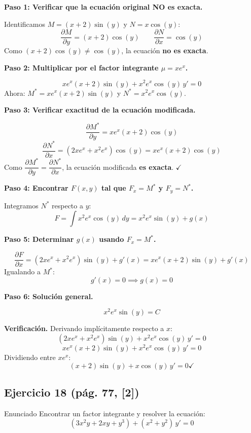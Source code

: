 \begin{respuesta}

\textbf{Paso 1: Verificar que la ecuación original NO es exacta.}

Identificamos $M = (x+2)\sin(y)$ y $N = x\cos(y)$:
\[
    \frac{\partial M}{\partial y} = (x+2)\cos(y) \qquad 
    \frac{\partial N}{\partial x} = \cos(y)
\]
Como $(x+2)\cos(y) \neq \cos(y)$, la ecuación \textbf{no es exacta}.

\medskip
\textbf{Paso 2: Multiplicar por el factor integrante $\mu = xe^x$.}

\[
    xe^x(x+2)\sin(y) + x^2e^x\cos(y)\,y' = 0
\]
Ahora: $M^* = xe^x(x+2)\sin(y)$ y $N^* = x^2e^x\cos(y)$.

\medskip
\textbf{Paso 3: Verificar exactitud de la ecuación modificada.}

\[
    \frac{\partial M^*}{\partial y} = xe^x(x+2)\cos(y)
\]
\[
    \frac{\partial N^*}{\partial x} = (2xe^x + x^2e^x)\cos(y) 
    = xe^x(x+2)\cos(y)
\]
Como $\dfrac{\partial M^*}{\partial y} = \dfrac{\partial N^*}{\partial x}$,
la ecuación modificada \textbf{es exacta}. $\checkmark$

\medskip
\textbf{Paso 4: Encontrar $F(x,y)$ tal que $F_x = M^*$ y $F_y = N^*$.}

Integramos $N^*$ respecto a $y$:
\[
    F = \int x^2e^x\cos(y)\,dy = x^2e^x\sin(y) + g(x)
\]

\medskip
\textbf{Paso 5: Determinar $g(x)$ usando $F_x = M^*$.}

\[
    \frac{\partial F}{\partial x} = (2xe^x + x^2e^x)\sin(y) + g'(x) 
    = xe^x(x+2)\sin(y) + g'(x)
\]
Igualando a $M^*$:
\[
    g'(x) = 0 \implies g(x) = 0
\]

\medskip
\textbf{Paso 6: Solución general.}

\[
    \boxed{x^2e^x\sin(y) = C}
\]

\medskip
\textbf{Verificación.} Derivando implícitamente respecto a $x$:
\[
    (2xe^x + x^2e^x)\sin(y) + x^2e^x\cos(y)\,y' = 0
\]
\[
    xe^x(x+2)\sin(y) + x^2e^x\cos(y)\,y' = 0
\]
Dividiendo entre $xe^x$:
\[
    (x+2)\sin(y) + x\cos(y)\,y' = 0 \checkmark
\]

\end{respuesta}

\subsection*{Ejercicio 18 \quad\normalfont\small(pág. 77, [2])}
\begin{enunciado}{Enunciado}
    Encontrar un factor integrante y resolver la ecuación:
    \[
        (3x^2y + 2xy + y^3) + (x^2 + y^2)\,y' = 0
    \]
\end{enunciado}

